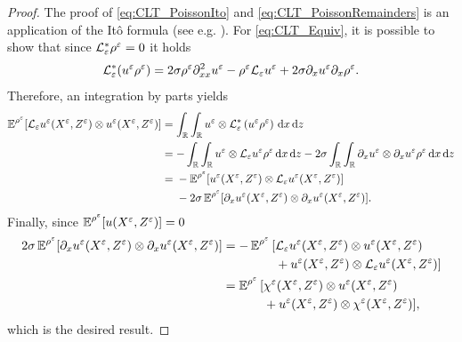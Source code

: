 \documentclass[10pt]{article}
\begin{document}
\begin{proof} The proof of \eqref{eq:CLT_PoissonIto} and \eqref{eq:CLT_PoissonRemainders} is an application of the Itô formula (see e.g. \cite[Remark 6.17]{PaS08}). For \eqref{eq:CLT_Equiv}, it is possible to show that since $\mathcal L_\varepsilon^*\rho^\varepsilon = 0$ it holds 
	\begin{equation}
		\mathcal L_\varepsilon^* (u^\varepsilon \rho^\varepsilon) = 2 \sigma \rho^\varepsilon \partial_{xx}^2 u^\varepsilon - \rho^\varepsilon \mathcal L_\varepsilon u^\varepsilon + 2 \sigma \partial_x u^\varepsilon \partial_x \rho^\varepsilon.
	\end{equation}
	Therefore, an integration by parts yields 
	\begin{equation}
	\begin{aligned}
		\operatorname{\mathbb{E}}^{\rho^\varepsilon}[\mathcal L_\varepsilon u^\varepsilon(X^\varepsilon, Z^\varepsilon) \otimes u^\varepsilon(X^\varepsilon, Z^\varepsilon)] &= 	\int_{\mathbb{R}}\int_{\mathbb{R}} u^\varepsilon \otimes \mathcal L_\varepsilon^*\left(u^\varepsilon \rho^\varepsilon\right) \,\mathrm{d} x \,\mathrm{d} z \\
		&= -\int_{\mathbb{R}}\int_{\mathbb{R}}u^\varepsilon \otimes \mathcal L_\varepsilon u^\varepsilon \rho^\varepsilon \,\mathrm{d} x \,\mathrm{d} z- 2\sigma \int_{\mathbb{R}}\int_{\mathbb{R}} \partial_x u^\varepsilon \otimes \partial_x u^\varepsilon \rho^\varepsilon \,\mathrm{d} x \,\mathrm{d} z\\
		&= 
		\begin{aligned}[t]
		&-\operatorname{\mathbb{E}}^{\rho^\varepsilon}[u^\varepsilon(X^\varepsilon, Z^\varepsilon) \otimes \mathcal L_\varepsilon u^\varepsilon(X^\varepsilon, Z^\varepsilon)] \\
		&- 2\sigma \operatorname{\mathbb{E}}^{\rho^\varepsilon}[\partial_x u^\varepsilon(X^\varepsilon, Z^\varepsilon) \otimes \partial_x u^\varepsilon(X^\varepsilon, Z^\varepsilon)].
		\end{aligned}
	\end{aligned}
	\end{equation}
	Finally, since $\operatorname{\mathbb{E}}^{\rho^\varepsilon}[u(X^\varepsilon, Z^\varepsilon)] = 0$ 
	\begin{equation}
	\begin{aligned}
		2\sigma \operatorname{\mathbb{E}}^{\rho^\varepsilon}[\partial_x u^\varepsilon(X^\varepsilon, Z^\varepsilon) \otimes \partial_x u^\varepsilon(X^\varepsilon, Z^\varepsilon)] &= -\operatorname{\mathbb{E}}^{\rho^\varepsilon}
		\begin{aligned}[t]
		[&\mathcal L_\varepsilon u^\varepsilon(X^\varepsilon, Z^\varepsilon) \otimes u^\varepsilon(X^\varepsilon, Z^\varepsilon) \\
		& + u^\varepsilon(X^\varepsilon, Z^\varepsilon) \otimes \mathcal L_\varepsilon u^\varepsilon(X^\varepsilon, Z^\varepsilon)]
		\end{aligned}
		\\
		&= \operatorname{\mathbb{E}}^{\rho^\varepsilon}
		\begin{aligned}[t]
		[&\chi^\varepsilon(X^\varepsilon, Z^\varepsilon) \otimes u^\varepsilon(X^\varepsilon, Z^\varepsilon) \\
		&+ u^\varepsilon(X^\varepsilon, Z^\varepsilon) \otimes \chi^\varepsilon(X^\varepsilon, Z^\varepsilon)],
		\end{aligned}
	\end{aligned}
	\end{equation}
	which is the desired result.
\end{proof}
\end{document}

